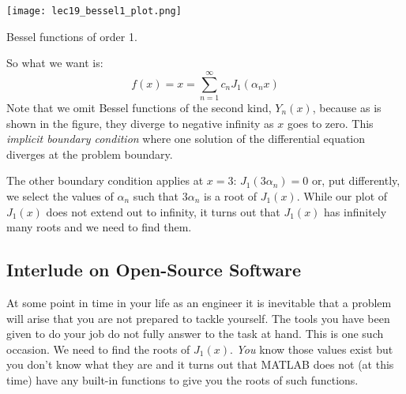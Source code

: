 \vspace{0.25cm}
\begin{marginfigure}
\texttt{[image: lec19\_bessel1\_plot.png]}
\label{fig:lec19-bessel}
\caption{Bessel functions of order 1.}
\end{marginfigure}
\noindent So what we want is:
\begin{equation*}
f(x) = x = \sum\limits_{n=1}^{\infty}c_n J_{1}\left(\alpha_n x\right)
\end{equation*}
Note that we omit Bessel functions of the second kind, $Y_n(x)$, because as is shown in the figure, they diverge to negative infinity as $x$ goes to zero.  This \emph{implicit boundary condition} where one solution of the differential equation diverges at the problem boundary.

The other boundary condition applies at $x=3$: $J_{1}(3\alpha_n) = 0$ or, put differently, we select the values of $\alpha_n$ such that $3\alpha_n$ is a root of $J_{1}(x)$.  While our plot of $J_1(x)$ does not extend out to infinity, it turns out that $J_1(x)$ has infinitely many roots and we need to find them.

\subsection{Interlude on Open-Source Software}
At some point in time in your life as an engineer it is inevitable that a problem will arise that you are not prepared to tackle yourself. The tools you have been given to do your job do not fully answer to the task at hand.  This is one such occasion.  We need to find the roots of $J_1(x)$.  \emph{You} know those values exist but you don't know what they are and it turns out that MATLAB does not (at this time) have any built-in functions to give you the roots of such functions.

